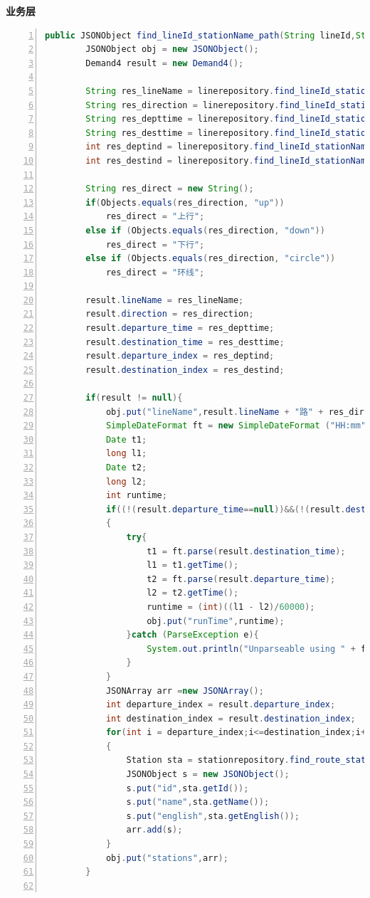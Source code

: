 \documentclass[11pt,a4paper]{article}
\begin{document}
\textbf{业务层} \\
\begin{lstlisting}[numbers = left, 
showstringspaces=false,
showspaces = false,
breaklines = true, 
language=Java]
public JSONObject find_lineId_stationName_path(String lineId,String stationName1,String stationName2){
        JSONObject obj = new JSONObject();
        Demand4 result = new Demand4();

        String res_lineName = linerepository.find_lineId_stationName_path_lineName(lineId, stationName1, stationName2);
        String res_direction = linerepository.find_lineId_stationName_path_direction(lineId, stationName1, stationName2);
        String res_depttime = linerepository.find_lineId_stationName_path_departtime(lineId, stationName1, stationName2);
        String res_desttime = linerepository.find_lineId_stationName_path_desttime(lineId, stationName1, stationName2);
        int res_deptind = linerepository.find_lineId_stationName_path_departind(lineId, stationName1, stationName2);
        int res_destind = linerepository.find_lineId_stationName_path_destind(lineId, stationName1, stationName2);

        String res_direct = new String();
        if(Objects.equals(res_direction, "up"))
            res_direct = "上行";
        else if (Objects.equals(res_direction, "down"))
            res_direct = "下行";
        else if (Objects.equals(res_direction, "circle"))
            res_direct = "环线";

        result.lineName = res_lineName;
        result.direction = res_direction;
        result.departure_time = res_depttime;
        result.destination_time = res_desttime;
        result.departure_index = res_deptind;
        result.destination_index = res_destind;

        if(result != null){
            obj.put("lineName",result.lineName + "路" + res_direct);
            SimpleDateFormat ft = new SimpleDateFormat ("HH:mm");
            Date t1;
            long l1;
            Date t2;
            long l2;
            int runtime;
            if((!(result.departure_time==null))&&(!(result.destination_time==null)))
            {
                try{
                    t1 = ft.parse(result.destination_time);
                    l1 = t1.getTime();
                    t2 = ft.parse(result.departure_time);
                    l2 = t2.getTime();
                    runtime = (int)((l1 - l2)/60000);
                    obj.put("runTime",runtime);
                }catch (ParseException e){
                    System.out.println("Unparseable using " + ft);
                }
            }
            JSONArray arr =new JSONArray();
            int departure_index = result.departure_index;
            int destination_index = result.destination_index;
            for(int i = departure_index;i<=destination_index;i++)
            {
                Station sta = stationrepository.find_route_station_by_index(result.lineName,result.direction,i);
                JSONObject s = new JSONObject();
                s.put("id",sta.getId());
                s.put("name",sta.getName());
                s.put("english",sta.getEnglish());
                arr.add(s);
            }
            obj.put("stations",arr);
        }


\end{lstlisting}
\end{document}
